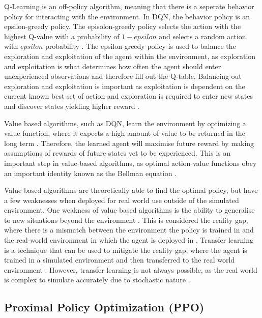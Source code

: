 Q-Learning is an off-policy algorithm, meaning that there is a seperate behavior policy for interacting with the environment. In DQN, the behavior policy is an epsilon-greedy policy. The episolon-greedy policy selects the action with the highest Q-value with a probability of $1 - epsilon$ and selects a random action with $epsilon$ probability \cite{TFAgentsAuthors2023}. The epsilon-greedy policy is used to balance the exploration and exploitation of the agent within the environment, as exploration and exploitation is what determines how often the agent should enter unexperienced observations and therefore fill out the Q-table. Balancing out exploration and exploitation is important as exploitation is dependent on the current known best set of  action and exploration is required to enter new states and discover states yielding higher reward \cite{TFAgentsAuthors2023}.

Value based algorithms, such as DQN, learn the environment by optimizing a value function, where it expects a high amount of value to be returned in the long term \cite{deepcheckRL}. Therefore, the learned agent will maximise future reward by making assumptions of rewards of future states yet to be experienced. This is an important step in value-based algorithms, as optimal action-value functions obey an important identity known as the Bellman equation \cite{mnih2013playing}. 

Value based algorithms are theoretically able to find the optimal policy, but have a few weaknesses when deployed for real world use outside of the simulated environment. One weakness of value based algorithms is the ability to generalise to new situations beyond the environment \cite{OdelTruxillo2023}. This is considered the reality gap, where there is a mismatch between the environment the policy is trained in and the real-world environment in which the agent is deployed in \cite{tobin2017domain}. Transfer learning is a technique that can be used to mitigate the reality gap, where the agent is trained in a simulated environment and then transferred to the real world environment \cite{OdelTruxillo2023}. However, transfer learning is not always possible, as the real world is complex to simulate accurately due to stochastic nature \cite{OdelTruxillo2023}. 

\subsection{Proximal Policy Optimization (PPO)}

